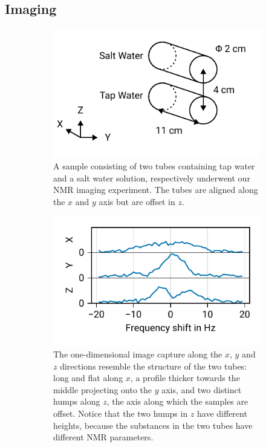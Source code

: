 \documentclass[
    parskip=half, 
    twoside=false,
    twocolumn=true,
    fontsize=11pt,
]{scrarticle}
\begin{document}
\subsection{Imaging}
\begin{figure}
    \centering
    \begin{subfigure}[c]{.45\textwidth}
        \label{fig:sample}
        \includegraphics{figures/07 sample holder.pdf}
        \caption{A sample consisting of two tubes containing tap water and a salt water solution, respectively underwent our NMR imaging experiment. The tubes are aligned along the $x$ and $y$ axis but are offset in $z$.}
    \end{subfigure}
    \begin{subfigure}[c]{.45\textwidth}
        \label{fig:1d_image}
        \includegraphics{figures/07 1d imaging.pdf}
        \caption{The one-dimensional image capture along the $x$, $y$ and $z$ directions resemble the structure of the two tubes: long and flat along $x$, a profile thicker towards the middle projecting onto the $y$ axis, and two distinct humps along $z$, the axis along which the samples are offset. Notice that the two humps in $z$ have different heights, because the substances in the two tubes have different NMR parameters.}
    \end{subfigure}
    \caption{}
\end{figure}
\end{document}
